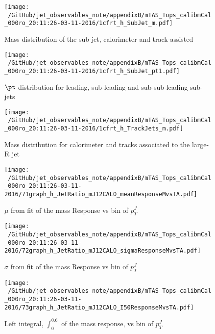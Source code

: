 \begin{figure}
 
\texttt{[image: ~/GitHub/jet\_observables\_note/appendixB/mTAS\_Tops\_calibmCal\_000ro\_20:11:26-03-11-2016/1cfrt\_h\_SubJet\_m.pdf]}
\caption{Mass distribution of the sub-jet, calorimeter and track-assisted}
 
\end{figure}
% 
\begin{figure}
 
\texttt{[image: ~/GitHub/jet\_observables\_note/appendixB/mTAS\_Tops\_calibmCal\_000ro\_20:11:26-03-11-2016/1cfrt\_h\_SubJet\_pt1.pdf]}
\caption{$\pt$ distribution for leading, sub-leading and sub-sub-leading sub-jets}
 
\end{figure}
\begin{figure}
 
\texttt{[image: ~/GitHub/jet\_observables\_note/appendixB/mTAS\_Tops\_calibmCal\_000ro\_20:11:26-03-11-2016/1cfrt\_h\_TrackJets\_m.pdf]}
\caption{Mass distribution for calorimeter and tracks associated to the large-R jet}
 
\end{figure}

%

\begin{figure}

\texttt{[image: ~/GitHub/jet\_observables\_note/appendixB/mTAS\_Tops\_calibmCal\_000ro\_20:11:26-03-11-2016/71graph\_h\_JetRatio\_mJ12CALO\_meanResponseMvsTA.pdf]}
\caption{$\mu $ from fit of the mass Response vs bin of  $p_{T}^{J}$}

\end{figure}
\begin{figure}

\texttt{[image: ~/GitHub/jet\_observables\_note/appendixB/mTAS\_Tops\_calibmCal\_000ro\_20:11:26-03-11-2016/72graph\_h\_JetRatio\_mJ12CALO\_sigmaResponseMvsTA.pdf]}
\caption{$\sigma $ from fit of the mass Response vs bin of $p_{T}^{J}$}

\end{figure}

\begin{figure}

\texttt{[image: ~/GitHub/jet\_observables\_note/appendixB/mTAS\_Tops\_calibmCal\_000ro\_20:11:26-03-11-2016/73graph\_h\_JetRatio\_mJ12CALO\_I50ResponseMvsTA.pdf]}
\caption{Left integral, $\int_{0}^{0.6} $ of the mass response, vs bin of  $p_{T}^{J}$}

\end{figure}

